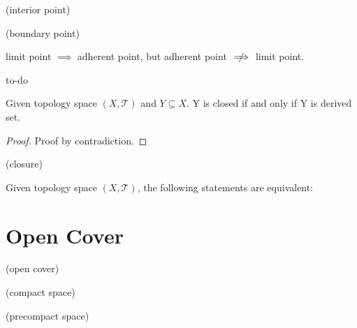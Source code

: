 \begin{definition}
(interior point)
\end{definition}

\begin{definition}
(boundary point)
\end{definition}

\begin{warning}
limit point $\implies$ adherent point, but adherent point $\centernot\implies$ limit point.
\end{warning}

\begin{example}
to-do
\end{example}

\begin{theorem}
Given topology space $(X, \mathcal{T})$ and $Y \subseteq X$. Y is closed if and only if Y is derived set. 
\end{theorem}

\begin{proof}
Proof by contradiction. 
\end{proof}

\begin{definition}
(closure)
\end{definition}

\begin{theorem}
Given topology space $(X, \mathcal{T})$, the following statements are equivalent: 
\end{theorem}

\begin{definition}
\end{definition}

\begin{definition}
\end{definition}

\section{Open Cover}

\begin{definition}
(open cover)
\end{definition}

\begin{definition}
(compact space)
\end{definition}

\begin{definition}
(precompact space)
\end{definition}

